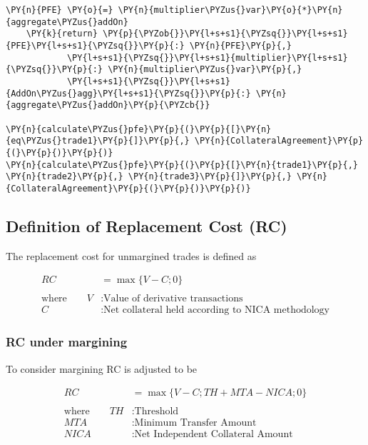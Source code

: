 \begin{tcolorbox}[breakable, size=fbox, boxrule=1pt, pad at break*=1mm,colback=cellbackground, colframe=cellborder]
\begin{Verbatim}[commandchars=\\\{\}]
    \PY{n}{PFE} \PY{o}{=} \PY{n}{multiplier\PYZus{}var}\PY{o}{*}\PY{n}{aggregate\PYZus{}addOn}
    \PY{k}{return} \PY{p}{\PYZob{}}\PY{l+s+s1}{\PYZsq{}}\PY{l+s+s1}{PFE}\PY{l+s+s1}{\PYZsq{}}\PY{p}{:} \PY{n}{PFE}\PY{p}{,}
            \PY{l+s+s1}{\PYZsq{}}\PY{l+s+s1}{multiplier}\PY{l+s+s1}{\PYZsq{}}\PY{p}{:} \PY{n}{multiplier\PYZus{}var}\PY{p}{,}
            \PY{l+s+s1}{\PYZsq{}}\PY{l+s+s1}{AddOn\PYZus{}agg}\PY{l+s+s1}{\PYZsq{}}\PY{p}{:} \PY{n}{aggregate\PYZus{}addOn}\PY{p}{\PYZcb{}}

\PY{n}{calculate\PYZus{}pfe}\PY{p}{(}\PY{p}{[}\PY{n}{eq\PYZus{}trade1}\PY{p}{]}\PY{p}{,} \PY{n}{CollateralAgreement}\PY{p}{(}\PY{p}{)}\PY{p}{)}
\PY{n}{calculate\PYZus{}pfe}\PY{p}{(}\PY{p}{[}\PY{n}{trade1}\PY{p}{,} \PY{n}{trade2}\PY{p}{,} \PY{n}{trade3}\PY{p}{]}\PY{p}{,} \PY{n}{CollateralAgreement}\PY{p}{(}\PY{p}{)}\PY{p}{)}
\end{Verbatim}
\end{tcolorbox}

    \hypertarget{definition-of-replacement-cost-rc}{%
\subsection{Definition of Replacement Cost
(RC)}\label{definition-of-replacement-cost-rc}}

The replacement cost for unmargined trades is defined as

\begin{align*}
RC &= \max\{V-C;0\} \\
\\
\text{where} \qquad V&: \text{Value of derivative transactions} \\
C&: \text{Net collateral held according to NICA methodology}
\end{align*}

\hypertarget{rc-under-margining}{%
\subsubsection{RC under margining}\label{rc-under-margining}}

To consider margining RC is adjusted to be

\begin{align*}
RC &= \max\{V-C; TH+MTA-NICA;0\} \\
\\
\text{where} \qquad TH&: \text{Threshold} \\
MTA&: \text{Minimum Transfer Amount} \\
NICA&: \text{Net Independent Collateral Amount}
\end{align*}

